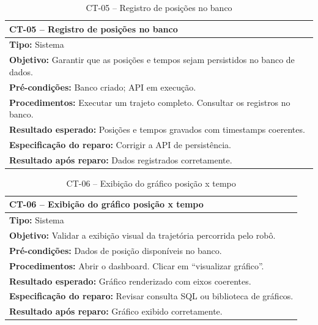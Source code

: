 
\begin{table}[H]
\centering
\begin{tabular}{|p{}|}
\hline
\textbf{CT-05 – Registro de posições no banco} \\ \hline
\textbf{Tipo:} Sistema \\ \hline
\textbf{Objetivo:} Garantir que as posições e tempos sejam persistidos no banco de dados. \\ \hline
\textbf{Pré-condições:} Banco criado; API em execução. \\ \hline
\textbf{Procedimentos:} Executar um trajeto completo. Consultar os registros no banco. \\ \hline
\textbf{Resultado esperado:} Posições e tempos gravados com timestamps coerentes. \\ \hline
\textbf{Especificação do reparo:} Corrigir a API de persistência. \\ \hline
\textbf{Resultado após reparo:} Dados registrados corretamente. \\ \hline
\end{tabular}
\caption{CT-05 – Registro de posições no banco}
\end{table}


\begin{table}[H]
\centering
\begin{tabular}{|p{}|}
\hline
\textbf{CT-06 – Exibição do gráfico posição x tempo} \\ \hline
\textbf{Tipo:} Sistema \\ \hline
\textbf{Objetivo:} Validar a exibição visual da trajetória percorrida pelo robô. \\ \hline
\textbf{Pré-condições:} Dados de posição disponíveis no banco. \\ \hline
\textbf{Procedimentos:} Abrir o dashboard. Clicar em “visualizar gráfico”. \\ \hline
\textbf{Resultado esperado:} Gráfico renderizado com eixos coerentes. \\ \hline
\textbf{Especificação do reparo:} Revisar consulta SQL ou biblioteca de gráficos. \\ \hline
\textbf{Resultado após reparo:} Gráfico exibido corretamente. \\ \hline
\end{tabular}
\caption{CT-06 – Exibição do gráfico posição x tempo}
\end{table}

